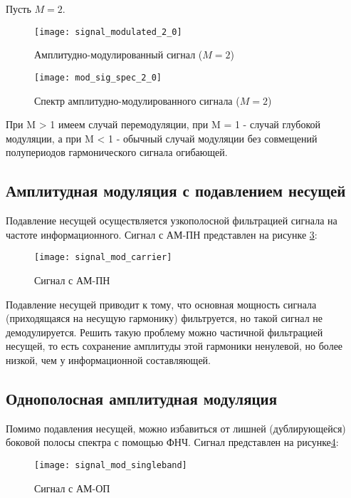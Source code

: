 Пусть $M = 2$.
\begin{figure}[H]
	\begin{center}
		\texttt{[image: signal\_modulated\_2\_0]}
		\caption{Амплитудно-модулированный сигнал ($M = 2$)} 
		\label{pic:signal_modulated_2_0} %
	\end{center}
\end{figure}
\begin{figure}[H]
	\begin{center}
		\texttt{[image: mod\_sig\_spec\_2\_0]}
		\caption{Спектр амплитудно-модулированного сигнала ($M = 2$)} 
		\label{pic:mod_sig_spec_2_0} %
	\end{center}
\end{figure}

При M > 1 имеем случай перемодуляции, при M = 1 - случай глубокой модуляции, а при M < 1 - обычный случай модуляции без совмещений полупериодов гармонического сигнала огибающей.

\subsection{Амплитудная модуляция с подавлением несущей}
Подавление несущей осуществляется узкополосной фильтрацией сигнала на частоте информационного. Сигнал с АМ-ПН представлен на рисунке \ref{pic:signal_mod_carrier}:
\begin{figure}[H]
	\begin{center}
		\texttt{[image: signal\_mod\_carrier]}
		\caption{Сигнал с АМ-ПН} 
		\label{pic:signal_mod_carrier} %
	\end{center}
\end{figure}
Подавление несущей приводит к тому, что основная мощность сигнала (приходящаяся на несущую гармонику) фильтруется, но такой сигнал не демодулируется. Решить такую проблему можно частичной фильтрацией несущей, то есть сохранение амплитуды этой гармоники ненулевой, но более низкой, чем у информационной составляющей.

\subsection{Однополосная амплитудная модуляция}
Помимо подавления несущей, можно избавиться от лишней (дублирующейся) боковой полосы спектра с помощью ФНЧ. Сигнал представлен на рисунке\ref{pic:signal_mod_singleband}:
\begin{figure}[H]
	\begin{center}
		\texttt{[image: signal\_mod\_singleband]}
		\caption{Сигнал с АМ-ОП} 
		\label{pic:signal_mod_singleband} %
	\end{center}
\end{figure}

